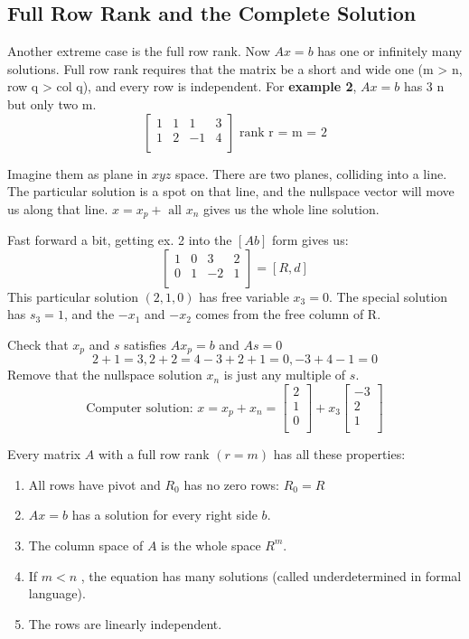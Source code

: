 \subsection{Full Row Rank and the Complete Solution}

Another extreme case is the full row rank. Now \(Ax = b\) has one or infinitely many solutions. Full row rank requires that the matrix be a short and wide one (m > n, row q > col q), and every row is independent. 
For \textbf{example 2}, \(Ax = b\) has 3 n but only two m. 
\[
    \begin{bmatrix}
        1 & 1 & 1 & 3  \\
        1 & 2 & -1 & 4  \\
    \end{bmatrix}
    \text{ rank r = m = 2}
\]   

Imagine them as plane in \(xyz\) space. There are two planes, colliding into a line. The particular solution is a spot on that line, and the nullspace vector will move us along that line. \(x = x_p + \text{ all } x_n\) gives us the whole line solution. 

Fast forward a bit, getting ex. 2 into the \([A b]\) form gives us:
\[
    \begin{bmatrix}
        1 & 0 & 3 & 2  \\
        0 & 1 & -2 & 1  \\
    \end{bmatrix}
    = [R, d]
\] 
This particular solution \((2, 1, 0)\) has free variable \(x_3 = 0\). The special solution has \(s_3 = 1\), and the \(-x_1\) and \(-x_2\) comes from the free column of R. 

Check that \(x_p\) and \(s\) satisfies \(Ax_p = b\) and \(As = 0\)
\[
    2 + 1 = 3, 2 + 2 = 4
    -3 + 2 + 1 = 0, -3 + 4 - 1 = 0
\]    
Remove that the nullspace solution \(x_n\) is just any multiple of \(s\). 
\[
    \text{Computer solution: } 
    x = x_p + x_n = 
    \begin{bmatrix}
         2 \\
         1 \\
         0 \\
    \end{bmatrix}
    + x_3
    \begin{bmatrix}
         -3 \\
         2 \\
         1 \\
    \end{bmatrix}
\]  

Every matrix \(A\) with a full row rank \((r = m)\) has all these properties: 
\begin{enumerate}
    \item All rows have pivot and \(R_0\) has no zero rows: \(R_0 = R\)
    \item \(Ax = b\) has a solution for every right side \(b\).
    \item The column space of \(A\) is the whole space \(R^m\).
    \item If \(m < n\) , the equation has many solutions (called underdetermined in formal language).    
    \item The rows are linearly independent.  
\end{enumerate}  

